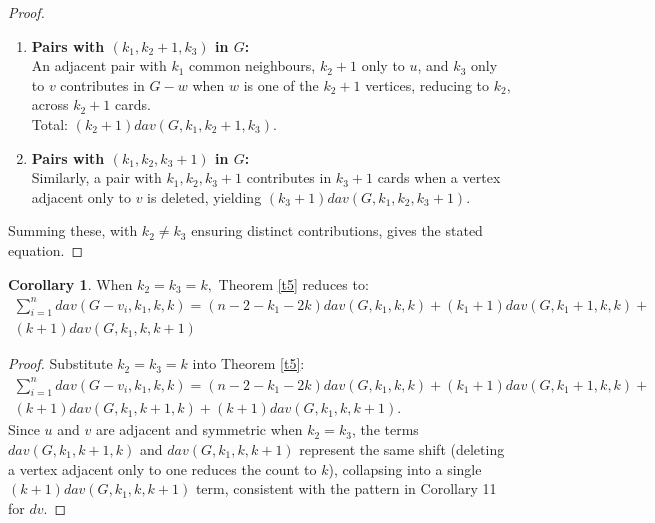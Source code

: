 \documentclass[11pt,oneside]{article}
\theoremstyle{definition}
\newtheorem{coro}[thm]{Corollary}
\begin{document}
\begin{proof}
\begin{enumerate}
    \item[\textbf{3.}] \textbf{Pairs with \( (k_1, k_2 + 1, k_3) \) in \( G \):} \\
    An adjacent pair with \( k_1 \) common neighbours, \( k_2 + 1 \) only to \( u \), and \( k_3 \) only to \( v \) contributes in \( G - w \) when \( w \) is one of the \( k_2 + 1 \) vertices, reducing to \( k_2 \), across \( k_2 + 1 \) cards. \\
    Total: \( (k_2 + 1) dav(G, k_1, k_2 + 1, k_3) \).

    \item[\textbf{4.}] \textbf{Pairs with \( (k_1, k_2, k_3 + 1) \) in \( G \):} \\
    Similarly, a pair with \( k_1, k_2, k_3 + 1 \) contributes in \( k_3 + 1 \) cards when a vertex adjacent only to \( v \) is deleted, yielding \( (k_3 + 1) dav(G, k_1, k_2, k_3 + 1) \).
\end{enumerate}

Summing these, with \( k_2 \neq k_3 \) ensuring distinct contributions, gives the stated equation.
\end{proof}


\begin{coro}\label{cor14}
When $k_2=k_3=k,$ Theorem \ref{t5} reduces to:
\begin{multline} 
\sum_{i=1}^{n}{dav(G-v_i,k_1,k,k)}=(n-2-k_1-2k)dav(G,k_1,k,k)+(k_1+1)dav(G,k_1+1,k,k)
+\\(k+1)dav(G,k_1,k,k+1) 
\end{multline}

\begin{proof} 

Substitute \( k_2 = k_3 = k \) into Theorem \ref{t5}:
\begin{multline}
\sum_{i=1}^n dav(G - v_i, k_1, k, k) = (n - 2 - k_1 - 2k) dav(G, k_1, k, k) + (k_1 + 1) dav(G, k_1 + 1, k, k)+ \\(k + 1) dav(G, k_1, k + 1, k) + (k + 1) dav(G, k_1, k, k + 1).
\end{multline}
Since \( u \) and \( v \) are adjacent and symmetric when \( k_2 = k_3 \), the terms \( dav(G, k_1, k + 1, k) \) and \( dav(G, k_1, k, k + 1) \) represent the same shift (deleting a vertex adjacent only to one reduces the count to \( k \)), collapsing into a single \( (k + 1) dav(G, k_1, k, k + 1) \) term, consistent with the pattern in Corollary 11 for \( dv \).
\end{proof}
\end{coro}
\end{document}
